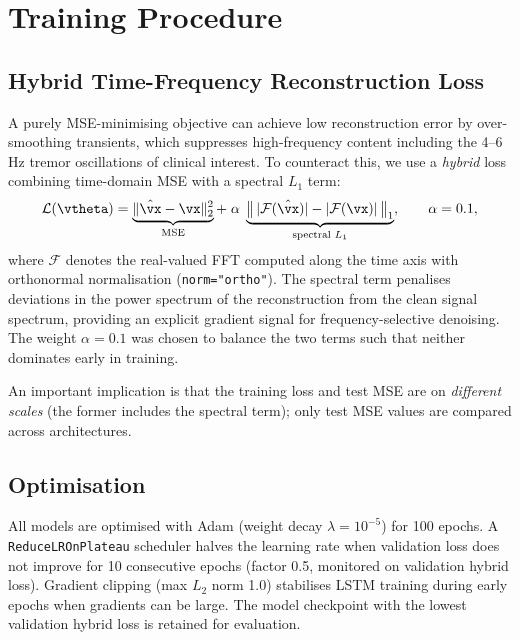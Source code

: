 \documentclass{article}
\begin{document}
\section{Training Procedure}
\label{sec:training}

\subsection{Hybrid Time-Frequency Reconstruction Loss}

A purely MSE-minimising objective can achieve low reconstruction error by
over-smoothing transients, which suppresses high-frequency content including
the 4--6\,Hz tremor oscillations of clinical interest.
To counteract this, we use a \emph{hybrid} loss combining time-domain MSE with
a spectral $L_1$ term:
%
\begin{equation}
  \mathcal{L}(\vtheta)
  = \underbrace{\|\hat{\vx} - \vx\|_2^2}_{\text{MSE}}
  + \;\alpha\;\underbrace{
      \bigl\|\,|\mathcal{F}(\hat{\vx})| - |\mathcal{F}(\vx)|\,\bigr\|_1
    }_{\text{spectral } L_1},
  \qquad \alpha = 0.1,
  \label{eq:loss}
\end{equation}
%
where $\mathcal{F}$ denotes the real-valued FFT computed along the time axis
with orthonormal normalisation (\texttt{norm="ortho"}).
The spectral term penalises deviations in the power spectrum of the
reconstruction from the clean signal spectrum, providing an explicit gradient
signal for frequency-selective denoising.
The weight $\alpha = 0.1$ was chosen to balance the two terms such that neither
dominates early in training.

An important implication is that the training loss and test MSE are on
\emph{different scales} (the former includes the spectral term); only test MSE
values are compared across architectures.

\subsection{Optimisation}

All models are optimised with Adam \citep{kingma2015adam} (weight decay
$\lambda = 10^{-5}$) for 100 epochs.
A \texttt{ReduceLROnPlateau} scheduler halves the learning rate when validation
loss does not improve for 10 consecutive epochs (factor 0.5, monitored on
validation hybrid loss).
Gradient clipping (max $L_2$ norm 1.0) stabilises LSTM training during early
epochs when gradients can be large.
The model checkpoint with the lowest validation hybrid loss is retained for
evaluation.
\end{document}
